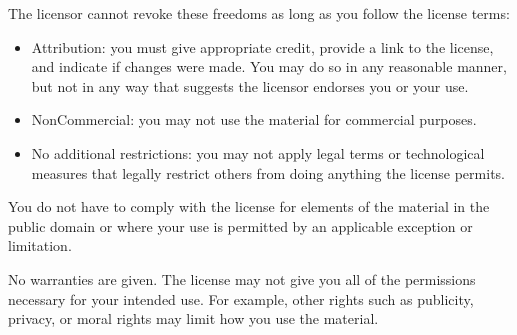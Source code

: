 {  The licensor cannot revoke these freedoms as long as you follow the
  license terms:

  \begin{itemize}
  \item Attribution: you must give appropriate credit, provide a link
  to the license, and indicate if changes were made. You may do so in
  any reasonable manner, but not in any way that suggests the licensor
  endorses you or your use.
  \item NonCommercial: you may not use the material for commercial
  purposes.
  \item No additional restrictions: you may not apply legal terms or
  technological measures that legally restrict others from doing
  anything the license permits.
  \end{itemize}

  You do not have to comply with the license for elements of the
  material in the public domain or where your use is permitted by an
  applicable exception or limitation.

  No warranties are given. The license may not give you all of the
  permissions necessary for your intended use. For example, other
  rights such as publicity, privacy, or moral rights may limit how you
  use the material.

 \clearpage

 \thispagestyle{plain}
 \par
}
\makeatother

